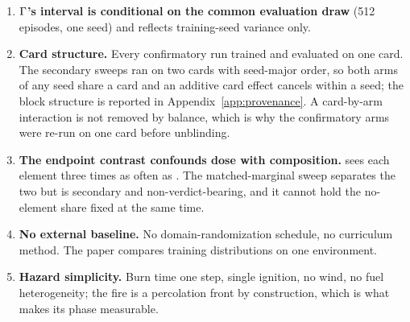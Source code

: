 \begin{enumerate}[leftmargin=*,itemsep=2pt]
  floors are owed.
  \item \textbf{$\Gamma$'s interval is conditional on the common evaluation
  draw} (512 episodes, one seed) and reflects training-seed variance only.
  \item \textbf{Card structure.} Every confirmatory run trained and evaluated
  on one card. The secondary sweeps ran on two cards with seed-major order,
  so both arms of any seed share a card and an additive card effect cancels
  within a seed; the block structure is reported in
  Appendix~\ref{app:provenance}. A card-by-arm interaction is not removed by
  balance, which is why the confirmatory arms were re-run on one card before
  unblinding.
  \item \textbf{The endpoint contrast confounds dose with composition.}
  \JOINT{} sees each element three times as often as \ISO{}. The matched-marginal
  sweep separates the two but is secondary and non-verdict-bearing, and it
  cannot hold the no-element share fixed at the same time.
  \item \textbf{No external baseline.} No domain-randomization schedule, no
  curriculum method. The paper compares training distributions on one
  environment.
  \item \textbf{Hazard simplicity.} Burn time one step, single ignition, no
  wind, no fuel heterogeneity; the fire is a percolation front by
  construction, which is what makes its phase measurable.
\end{enumerate}
